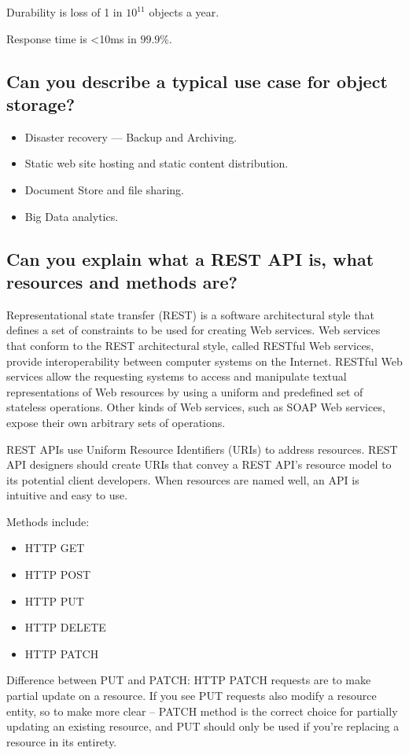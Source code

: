 \documentclass{article}
\begin{document}
Durability is loss of 1 in $10^{11}$ objects a year.

Response time is <10ms in $99.9\%$.

\subsection{Can you describe a typical use case for object storage?}


\begin{itemize}
\item Disaster recovery — Backup and Archiving.
\item Static web site hosting and static content distribution.
\item Document Store and file sharing.
\item Big Data analytics.
\end{itemize}

\subsection{Can you explain what a REST API is, what resources and methods are?}


Representational state transfer (REST) is a software architectural style that defines a set of constraints to be used for creating Web services. Web services that conform to the REST architectural style, called RESTful Web services, provide interoperability between computer systems on the Internet. RESTful Web services allow the requesting systems to access and manipulate textual representations of Web resources by using a uniform and predefined set of stateless operations. Other kinds of Web services, such as SOAP Web services, expose their own arbitrary sets of operations.

REST APIs use Uniform Resource Identifiers (URIs) to address resources. REST API designers should create URIs that convey a REST API's resource model to its potential client developers. When resources are named well, an API is intuitive and easy to use.

Methods include:
\begin{itemize}
\item HTTP GET
\item HTTP POST
\item HTTP PUT
\item HTTP DELETE
\item HTTP PATCH
\end{itemize}

Difference between PUT and PATCH: HTTP PATCH requests are to make partial update on a resource. If you see PUT requests also modify a resource entity, so to make more clear – PATCH method is the correct choice for partially updating an existing resource, and PUT should only be used if you’re replacing a resource in its entirety.
\end{document}
